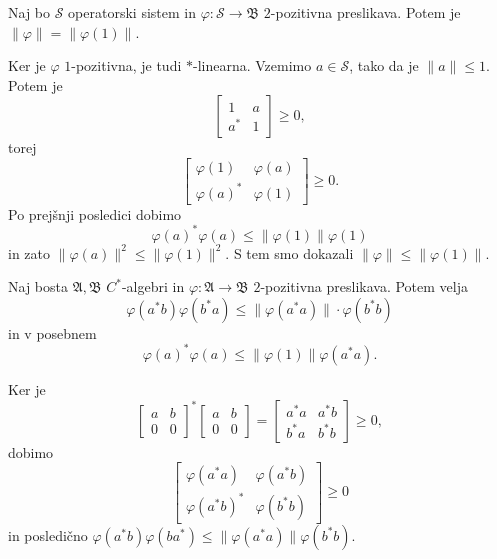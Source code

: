 \begin{posledica}\label{pos:1.3}
    Naj bo $\mathcal{S}$ operatorski sistem in $\varphi: \mathcal{S} \to \mathfrak{B}$ $2$-pozitivna preslikava.
    Potem je $\| \varphi \| = \| \varphi(1)\|$.
\end{posledica}

\begin{dokaz}
    Ker je $\varphi$ $1$-pozitivna, je tudi $*$-linearna.
    Vzemimo $a \in \mathcal{S}$, tako da je $\| a\| \leq 1$.
    Potem je $$\begin{bmatrix}
        1 & a\\
        a^* & 1
    \end{bmatrix} \geq 0,$$
    torej 
    $$\begin{bmatrix}
        \varphi(1) & \varphi(a)\\
        \varphi(a)^* & \varphi(1)
    \end{bmatrix} \geq 0.$$
    Po prejšnji posledici dobimo $$\varphi (a) ^* \varphi(a) \leq \| \varphi(1)\| \varphi(1)$$
    in zato $\| \varphi(a)\|^2 \leq \| \varphi(1)\|^2$.
    S tem smo dokazali $\| \varphi \| \leq \| \varphi(1)\|$.
\end{dokaz}

\begin{posledica}
    Naj bosta $\mathfrak{A}, \mathfrak{B}$ $C^*$-algebri in $\varphi: \mathfrak{A} \to \mathfrak{B}$ 
    $2$-pozitivna preslikava. Potem velja $$\varphi (a^* b) \varphi (b^* a) \leq  \| \varphi (a^* a ) \| \cdot \varphi (b^* b)$$
    in v posebnem
    $$\varphi (a)^* \varphi (a) \leq \| \varphi(1)\| \varphi(a^* a).$$
\end{posledica}

\begin{dokaz}
    Ker je
    $$\begin{bmatrix}
        a & b\\
        0 & 0
    \end{bmatrix}^* \begin{bmatrix}
        a & b\\
        0 & 0
    \end{bmatrix} = \begin{bmatrix}
        a^* a & a^* b\\
        b^* a & b^* b
    \end{bmatrix} \geq 0,$$
    dobimo
    $$\begin{bmatrix}
        \varphi(a^* a) & \varphi(a^* b)\\
        \varphi(a^* b)^* & \varphi(b^* b)
    \end{bmatrix} \geq 0$$
    in posledično $\varphi (a^* b) \varphi(b a^*) \leq \| \varphi(a^* a) \| \varphi(b^* b)$.
\end{dokaz}

